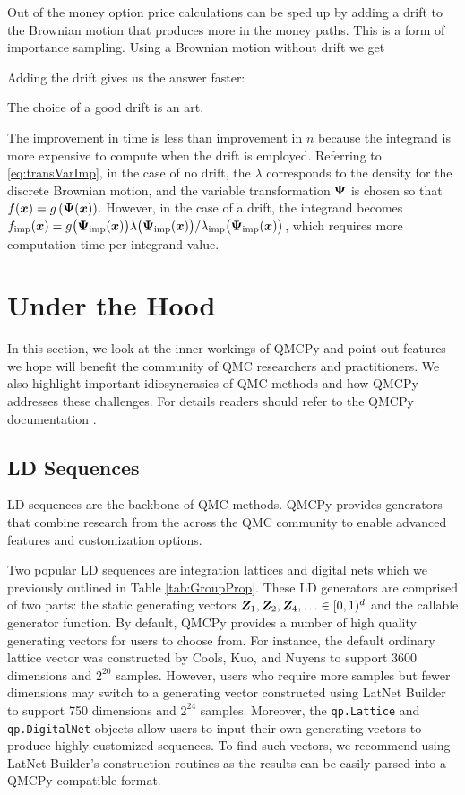 \documentclass[graybox,footinfo]{svmult}
\newcommand{\IMP}{\textup{imp}}
\begin{document}
Out of the money option price calculations can be sped up by adding a drift to the Brownian motion that produces more in the money paths.  This is a form of importance sampling.  Using a Brownian motion without drift we get

Adding the drift gives us the answer faster:

The choice of a good drift is an art.  

The improvement in time is less than improvement in $n$ because the integrand is more expensive to compute when the drift is employed.  Referring to \eqref{eq:transVarImp}, in the case of no drift, the $\lambda$ corresponds to the density for the discrete Brownian motion, and the variable transformation ${\boldsymbol{\Psi}}$ is chosen so that $f({\boldsymbol{x}}) = g\left({\boldsymbol{\Psi}}({\boldsymbol{x}}) \right)$.  However, in the case of a drift, the integrand becomes  $f_\IMP(\bsx)  = g\bigl(\bsPsi_\IMP(\bsx)\bigr)  \lambda\bigl(\bsPsi_\IMP(\bsx)\bigr)/\lambda_\IMP\bigl(\bsPsi_\IMP(\bsx)\bigr)$, which requires more computation time per integrand value. 

\section{Under the Hood}

In this section, we look at the inner workings of QMCPy and point out features we hope will benefit the community of QMC researchers and practitioners. We also highlight important idiosyncrasies of QMC methods and how QMCPy addresses these challenges. For details readers should refer to the QMCPy documentation \cite{QMCPyDocs}.

\subsection{LD Sequences}

LD sequences are the backbone of QMC methods. QMCPy provides generators that combine research from the across the QMC community to enable advanced features and customization options.

Two popular LD sequences are integration lattices and digital nets which we previously outlined in Table \ref{tab:GroupProp}. These LD generators are comprised of two parts: the static generating vectors ${\boldsymbol{Z}}_1,{\boldsymbol{Z}}_2,{\boldsymbol{Z}}_4, \ldots \in [0,1)^d$ and the callable generator function. By default, QMCPy provides a number of high quality generating vectors for users to choose from. For instance, the default ordinary lattice vector was constructed by Cools, Kuo, and Nuyens \cite{doi:10.1137/06065074X} to support 3600 dimensions and $2^{20}$ samples. However, users who require more samples but fewer dimensions may switch to a generating vector constructed using LatNet Builder \cite{LEcEtal22a,LatNet} to support 750 dimensions and $2^{24}$ samples. Moreover, the \texttt{qp.Lattice} and \texttt{qp.DigitalNet} objects allow users to input their own generating vectors to produce highly customized sequences. To find such vectors, we recommend using LatNet Builder's construction routines as the results can be easily parsed into a QMCPy-compatible format. 
\end{document}
